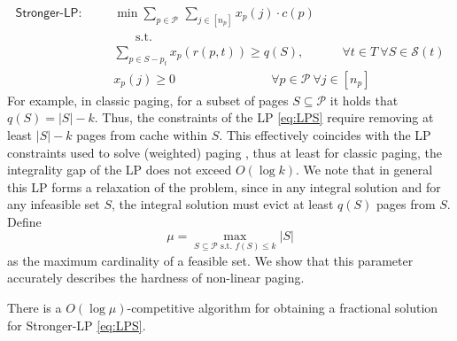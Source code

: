 \documentclass[11pt]{article}
\newcommand{\cP}{{\mathcal{P}}}
\newcommand{\cS}{{\mathcal{S}}}
\begin{document}
{\begin{equation}
	\label{eq:LPS}
	\begin{aligned}
		\textsf{Stronger-LP}:~~~~~~~~	& \min \sum_{p \in \cP~} \sum_{j \in [n_p]}  x_p(j) \cdot c(p)\\
		& ~~~~~~~~\text{s.t. }\\
		& \sum_{p \in S-p_t} x_p(r(p,t)) \geq q(S), 	~~~~~~~~~~~~~~\forall t \in T~\forall S  \in \cS(t) \\ 
		& x_p(j) \geq 0 ~~~~~~~~~~~~~~~~~~~~~~~~~~~~~~~~~~~	\forall p \in \cP~\forall j \in [n_p]
	\end{aligned}
\end{equation} For example, in classic paging, for a subset of pages $S \subseteq \cP$ it holds that $q(S) = |S|-k$. Thus, the constraints of the LP \eqref{eq:LPS} require removing at least $|S|-k$ pages from cache within $S$. This effectively coincides with the LP constraints used to solve (weighted) paging \cite{bansal2012primal}, thus at least for classic paging, the integrality gap of the LP does not exceed $O(\log k)$. We note that in general this LP forms a relaxation of the problem, since in any integral solution and for any infeasible set $S$, the integral solution must evict at least $q(S)$ pages from $S$. %
Define 
\begin{equation}
	\label{eq:mu}
	\mu = \max_{S \subseteq \cP \text{ s.t. } f(S) \leq k} |S|
\end{equation} as the maximum cardinality of a feasible set. We show that this parameter accurately describes the hardness of non-linear paging. %

\begin{theorem}
	\label{thm:MU}
	There is a $O\left(\log \mu\right)$-competitive algorithm for obtaining a fractional solution for \textnormal{\textsf{Stronger-LP}} \eqref{eq:LPS}. 
\end{theorem}


}
\end{document}
